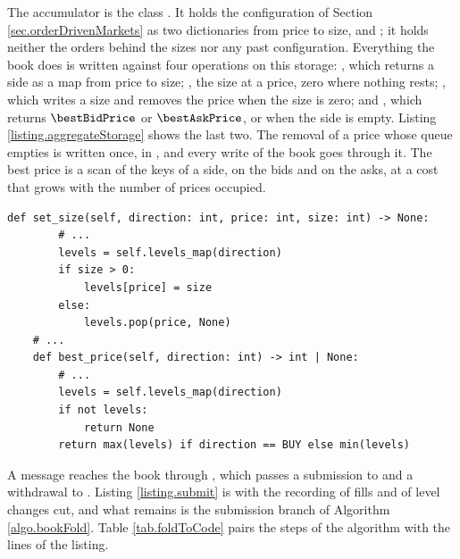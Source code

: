 The accumulator is the class .
It holds the configuration of Section \ref{sec.orderDrivenMarkets} as two dictionaries from
price to size,  and ;
it holds neither the orders behind the sizes nor any past configuration.
Everything the book does is written against four operations on this storage:
, which returns a side as a map from price to size;
, the size at a price, zero where nothing rests;
, which writes a size and removes the price when the size is zero;
and , which returns $\bestBidPrice$ or $\bestAskPrice$,
or  when the side is empty.
Listing \ref{listing.aggregateStorage} shows the last two.
The removal of a price whose queue empties is written once, in ,
and every write of the book goes through it.
The best price is a scan of the keys of a side,
 on the bids and  on the asks,
at a cost that grows with the number of prices occupied.

\begin{lstlisting}[caption={\protect\codehl{unito26.lob.orderbook.AggregateBook}: a write, and the best price. Docstrings elided.}, label=listing.aggregateStorage]
    def set_size(self, direction: int, price: int, size: int) -> None:
        # ...
        levels = self.levels_map(direction)
        if size > 0:
            levels[price] = size
        else:
            levels.pop(price, None)
    # ...
    def best_price(self, direction: int) -> int | None:
        # ...
        levels = self.levels_map(direction)
        if not levels:
            return None
        return max(levels) if direction == BUY else min(levels)
\end{lstlisting}

A message reaches the book through ,
which passes a submission to  and a withdrawal to .
Listing \ref{listing.submit} is 
with the recording of fills and of level changes cut,
and what remains is the submission branch of Algorithm \ref{algo.bookFold}.
Table \ref{tab.foldToCode} pairs the steps of the algorithm with the lines of the listing.

